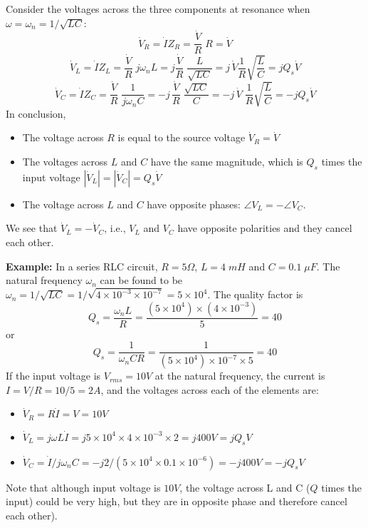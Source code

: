 Consider the voltages across the three components at 
resonance when $\omega=\omega_n=1/\sqrt{LC}$:
\[
\dot{V}_R=\dot{I} Z_R =\frac{\dot{V}}{R} \;R=\dot{V}
\]
\[ 
\dot{V}_L=\dot{I} Z_L=\frac{\dot{V}}{R}\;j\omega_n L
=j\frac{\dot{V}}{R}\;\frac{L}{\sqrt{LC}}
=j\,\dot{V} \frac{1}{R}\sqrt{\frac{L}{C}}=jQ_s\dot{V}	
\]
\[ 
\dot{V}_C=\dot{I} Z_C=\frac{\dot{V}}{R}\;\frac{1}{j\omega_n C}
=-j\,\frac{\dot{V}}{R}\;\frac{\sqrt{LC}}{C}
=-j\,\dot{V}\;\frac{1}{R}\sqrt{\frac{L}{C}}=-jQ_s\dot{V}	
\]
In conclusion,
\begin{itemize}
\item The voltage across $R$ is equal to the source voltage
  $\dot{V}_R=\dot{V}$
\item The voltages across $L$ and $C$ have the same magnitude, which 
  is $Q_s$ times the input voltage $|\dot{V}_L|=|\dot{V}_C|=Q_s\dot{V}$
\item The voltage across $L$ and $C$ have opposite phases: 
  $\angle V_L=-\angle V_C$.
\end{itemize}
We see that $\dot{V}_L=-\dot{V}_C$, i.e., $V_L$ and $V_C$ have 
opposite polarities and they cancel each other.

\begin{comment}
and the admittances $Y=1/Z$ for different $Q$ ($R$) and $C$ are shown below.
The bandpass effect can be intuitively explained. When $\omega$ is high,
the inductor's impedance $\omega L$ is high, and when $\omega$ is low,
the capacitor's impedance $1/\omega C$ is high. When $\omega=\omega_n$
the overall impedance is the smallest. If the input is a voltage source 
$v(t)$, the current through the circuit will reach a maximum value when 
$\omega=\omega_n$.

\htmladdimg{../figures/omega0b.gif}
\htmladdimg{../figures/omega0a.gif}
\end{comment}

{\bf Example: } In a series RLC circuit, $R=5\Omega$, $L=4\;mH$ and
$C=0.1\;\mu F$. The natural frequency $\omega_n$ can be found to be
$\omega_n=1/\sqrt{LC}=1/\sqrt{4\times 10^{-3}\times 10^{-7}}=5\times 10^4$.
The quality factor is
\[	
Q_s=\frac{\omega_nL}{R}=\frac{(5\times 10^4)\times (4\times 10^{-3})}{5}
=40	
\]
or
\[
Q_s=\frac{1}{\omega_nCR}=\frac{1}{(5\times 10^4)\times 10^{-7}\times 5}
=40	
\]
If the input voltage is $V_{rms}=10V$ at the natural frequency, the current
is $I=V/R=10/5=2 A$, and the voltages across each of the elements are:
\begin{itemize}
\item $\dot{V}_R=R\dot{I}=V=10V$
\item $\dot{V}_L=j\omega L \dot{I}=j5\times 10^4\times 4\times 10^{-3} \times 2=j400V=jQ_sV$
\item $\dot{V}_C=\dot{I}/j\omega_nC=-j2/(5\times 10^4\times 0.1\times 10^{-6})=-j400V=-jQ_sV$
\end{itemize}
Note that although input voltage is $10V$, the voltage across L and C ($Q$ 
times the input) could be very high, but they are in opposite phase and 
therefore cancel each other).


